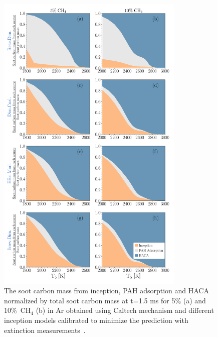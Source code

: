 \begin{figure}[H]
	\centering
	\includegraphics[width=0.8\textwidth]{Figures/Results/Shocktube/Agafonov2016_cpr/C_tot_distmap.pdf}
	\caption{The soot carbon mass from inception, PAH adsorption and HACA normalized by total soot carbon mass at t=1.5 ms for 5\% (a) and 10\%~$\mathrm{CH_4}$ (b) in Ar obtained using Caltech mechanism and different inception models calibrated to minimize the prediction with extinction measurements~\citep{agafonov2016unified}.}
	\label{fig:shockagof_carbon_map_cpr} 
\end{figure}

